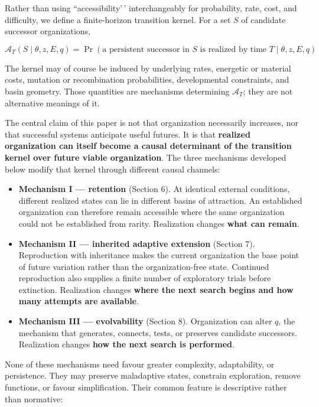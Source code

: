 \documentclass[11pt]{article}
\providecommand{\tightlist}{\setlength{\itemsep}{0pt}\setlength{\parskip}{0pt}}
\begin{document}
Rather than using ``accessibility'\,' interchangeably for probability,
rate, cost, and difficulty, we define a finite-horizon transition
kernel. For a set \(S\) of candidate successor organizations,

\[
\boxed{
\mathcal A_T(S\mid\theta,z,E,q)
=
\Pr\!\left(\text{a persistent successor in }S\text{ is realized by time }T\mid\theta,z,E,q\right)
}
\tag{0}
\]

The kernel may of course be induced by underlying rates, energetic or
material costs, mutation or recombination probabilities, developmental
constraints, and basin geometry. Those quantities are mechanisms
determining \(\mathcal A_T\); they are not alternative meanings of it.

The central claim of this paper is not that organization necessarily
increases, nor that successful systems anticipate useful futures. It is
that \textbf{realized organization can itself become a causal
determinant of the transition kernel over future viable organization}.
The three mechanisms developed below modify that kernel through
different causal channels:

\begin{itemize}
\tightlist
\item
  \textbf{Mechanism I --- retention} (Section 6). At identical external
  conditions, different realized states can lie in different basins of
  attraction. An established organization can therefore remain
  accessible where the same organization could not be established from
  rarity. Realization changes \textbf{what can remain}.
\item
  \textbf{Mechanism II --- inherited adaptive extension} (Section 7).
  Reproduction with inheritance makes the current organization the base
  point of future variation rather than the organization-free state.
  Continued reproduction also supplies a finite number of exploratory
  trials before extinction. Realization changes \textbf{where the next
  search begins and how many attempts are available}.
\item
  \textbf{Mechanism III --- evolvability} (Section 8). Organization can
  alter \(q\), the mechanism that generates, connects, tests, or
  preserves candidate successors. Realization changes \textbf{how the
  next search is performed}.
\end{itemize}

None of these mechanisms need favour greater complexity, adaptability,
or persistence. They may preserve maladaptive states, constrain
exploration, remove functions, or favour simplification. Their common
feature is descriptive rather than normative:
\end{document}
